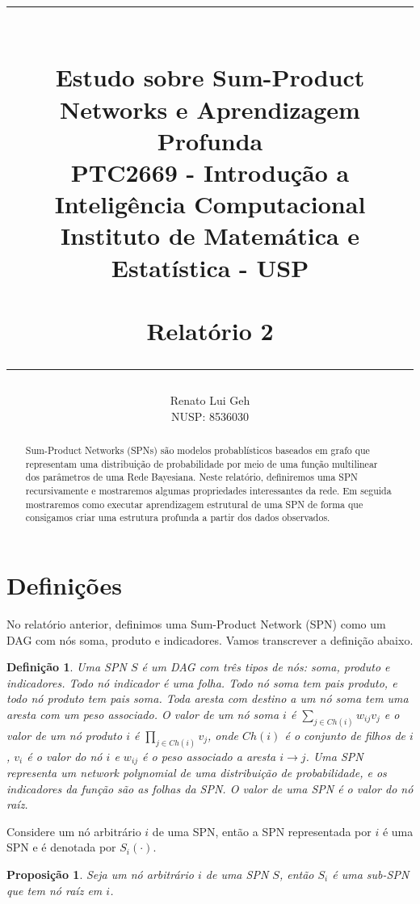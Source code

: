 \documentclass{amsart}
\title{%
  \noindent\rule{10cm}{0.8pt}\\
  Estudo sobre Sum-Product Networks e Aprendizagem Profunda\\[1ex]
  \scriptsize\mdseries
  PTC2669 - Introdução a Inteligência Computacional\\
  Instituto de Matemática e Estatística - USP\\%
  \tiny~\\
  Relatório 2\\%
  \noindent\rule{10cm}{0.8pt}
}
\author[]{Renato Lui Geh\\NUSP\@: 8536030}
\theoremstyle{plain}
\newcounter{dummy-def}\numberwithin{dummy-def}{section}
\newtheorem{definition}[dummy-def]{Definição}
\newcounter{dummy-thm}\numberwithin{dummy-thm}{section}
\newcounter{dummy-prop}\numberwithin{dummy-prop}{section}
\newtheorem{proposition}[dummy-prop]{Proposição}
\newcounter{dummy-ex}\numberwithin{dummy-ex}{section}
\newcounter{dummy-eg}\numberwithin{dummy-eg}{section}
\numberwithin{equation}{section}
\begin{document}
\begin{abstract}
  Sum-Product Networks (SPNs) são modelos probablísticos baseados em grafo que representam uma
  distribuição de probabilidade por meio de uma função multilinear dos parâmetros de uma Rede
  Bayesiana. Neste relatório, definiremos uma SPN recursivamente e mostraremos algumas propriedades
  interessantes da rede. Em seguida mostraremos como executar aprendizagem estrutural de uma SPN
  de forma que consigamos criar uma estrutura profunda a partir dos dados observados.
  \vspace*{-3.5em}
\end{abstract}

\maketitle

\section{Definições}

No relatório anterior, definimos uma Sum-Product Network (SPN) como um DAG com nós soma, produto
e indicadores. Vamos transcrever a definição abaixo.

\begin{definition}\label{pd-def}
  Uma SPN $S$ é um DAG com três tipos de nós: soma, produto e indicadores. Todo nó indicador é uma
  folha. Todo nó soma tem pais produto, e todo nó produto tem pais soma. Toda aresta com destino a
  um nó soma tem uma aresta com um peso associado. O valor de um nó soma $i$ é $\sum_{j\in Ch(i)}
  w_{ij}v_j$ e o valor de um nó produto $i$ é $\prod_{j\in Ch(i)}v_j$, onde $Ch(i)$ é o conjunto
  de filhos de $i$, $v_i$ é o valor do nó $i$ e $w_{ij}$ é o peso associado a aresta $i\to j$. Uma
  SPN representa um \emph{network polynomial} de uma distribuição de probabilidade, e os
  indicadores da função são as folhas da SPN\@. O valor de uma SPN é o valor do nó raíz.
\end{definition}

Considere um nó arbitrário $i$ de uma SPN, então a SPN representada por $i$ é uma SPN e é denotada
por $S_i(\cdot)$.

\begin{proposition}
  Seja um nó arbitrário $i$ de uma SPN $S$, então $S_i$ é uma sub-SPN que tem nó raíz em $i$.
\end{proposition}
\end{document}
